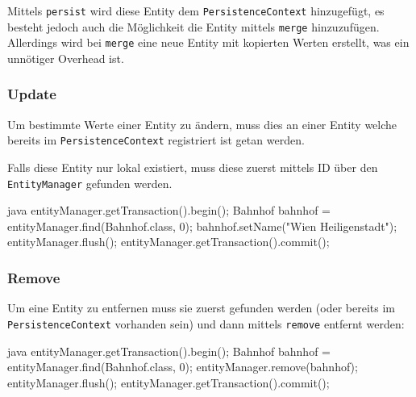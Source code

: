 Mittels \texttt{persist} wird diese Entity dem \texttt{PersistenceContext} hinzugefügt, es besteht jedoch auch die Möglichkeit die Entity mittels \texttt{merge} hinzuzufügen. Allerdings wird bei \texttt{merge} eine neue Entity mit kopierten Werten erstellt, was ein unnötiger Overhead ist.

\subsubsection{Update}

Um bestimmte Werte einer Entity zu ändern, muss dies an einer Entity welche bereits im \texttt{PersistenceContext} registriert ist getan werden.

Falls diese Entity nur lokal existiert, muss diese zuerst mittels ID über den \texttt{EntityManager} gefunden werden.

\begin{code}{java}
entityManager.getTransaction().begin();
Bahnhof bahnhof = entityManager.find(Bahnhof.class, 0);
bahnhof.setName("Wien Heiligenstadt");
entityManager.flush();
entityManager.getTransaction().commit();
\end{code}

\subsubsection{Remove}

Um eine Entity zu entfernen muss sie zuerst gefunden werden (oder bereits im \texttt{PersistenceContext} vorhanden sein) und dann mittels \texttt{remove} entfernt werden:

\begin{code}{java}
entityManager.getTransaction().begin();
Bahnhof bahnhof = entityManager.find(Bahnhof.class, 0);
entityManager.remove(bahnhof);
entityManager.flush();
entityManager.getTransaction().commit();
\end{code}


